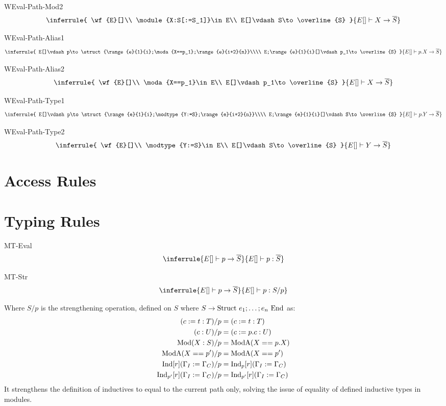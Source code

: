 WEval-Path-Mod2
\[
\inferrule{
    \wf{E}[]\\
    \module{X:S[:=S_1]}\in E\\
    E[]\vdash S\to\overline{S}
}{
    E[]\vdash X\to\overline{S}
}
\]

WEval-Path-Alias1
\[
\inferrule{
    E[]\vdash p\to\struct{\range{e}{1}{i};\moda{X==p_1};\range{e}{i+2}{n}}\\\\    
    E;\range{e}{1}{i}[]\vdash p_1\to\overline{S}
}{
    E[]\vdash p.X\to\overline{S}
}
\]

WEval-Path-Alias2
\[
\inferrule{
    \wf{E}[]\\
    \moda{X==p_1}\in E\\
    E[]\vdash p_1\to\overline{S}
}{
    E[]\vdash X\to\overline{S}
}
\]

WEval-Path-Type1
\[
\inferrule{
    E[]\vdash p\to\struct{\range{e}{1}{i};\modtype{Y:=S};\range{e}{i+2}{n}}\\\\    
    E;\range{e}{1}{i}[]\vdash S\to\overline{S}
}{
    E[]\vdash p.Y\to\overline{S}
}
\]

WEval-Path-Type2
\[
\inferrule{
    \wf{E}[]\\
    \modtype{Y:=S}\in E\\
    E[]\vdash S\to\overline{S}
}{
    E[]\vdash Y\to\overline{S}
}
\]

\section{Access Rules}
\label{sec:typing-access}


\section{Typing Rules}
\label{sec:typing-typing}
MT-Eval
\[
\inferrule{
    E[]\vdash p\to\overline{S}
}{
    E[]\vdash p:\overline{S}
}      
\]

MT-Str
\[
\inferrule{
    E[]\vdash p\to\overline{S}
}{
    E[]\vdash p:S/p
}      
\]

Where $S/p$ is the strengthening operation, defined on $S$ where $S\to\text{Struct }{e}_{1};\ldots;{e}_{n}\text{ End}$ as:
\begin{align*}
(c:=t:T)/p &= (c:=t:T)\\
(c:U)/p &= (c:=p.c:U)\\
\text{Mod}(X:S)/p &= \text{ModA}(X==p.X)\\
\text{ModA}(X==p')/p &= \text{ModA}(X==p')\\
\text{Ind}[r](\Gamma_I :=\Gamma_C)/p &= \text{Ind}_p[r](\Gamma_I :=\Gamma_C)\\
\text{Ind}_{p'}[r](\Gamma_I :=\Gamma_C)/p &= \text{Ind}_{p'}[r](\Gamma_I :=\Gamma_C)
\end{align*}
It strengthens the definition of inductives to equal to the current path only,
solving the issue of equality of defined inductive types in modules.

